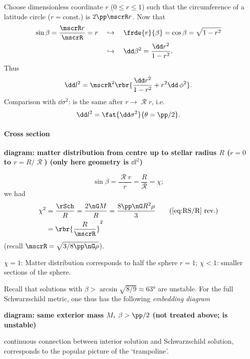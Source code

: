 
Choose dimensionless coordinate $r$ ($0 \le r \le 1$) such that the
circumference of a latitude circle ($r = \text{const.}$) is $2\pp \mscrR r$.
Now that
\begin{align}
\sin\beta = \frac{\mscrR r}{\mscrR} = r
\quad &\hookrightarrow \quad
\frde{r}{\beta} = \cos\beta = \sqrt{1-r^2} \nonumber \\
&\hookrightarrow \quad \dd \beta^2 = \frac{\dd r^2}{1-r^2}.
\end{align}
Thus
\begin{equation}
\dd l^2 = \mscrR^2\rbr{\frac{\dd r^2}{1-r^2}+r^2\dd\,\phi^2}.
\end{equation}
Comparison with $\dd \sigma^2$: is the same after $r\to \mscrR r$, i.e.\
\begin{equation}
\dd l^2 = \fat{\dd \sigma^2}{\theta = \pp/2}.
\end{equation}

\paragraph{Cross section}

\textbf{diagram: matter distribution from centre up to stellar radius $R$
($r = 0$ to $r = R/\mscrR$) (only here geometry is $\dd l^2$)}

\begin{equation}
\sin\beta = \frac{\mscrR r}{r} = \frac{R}{\mscrR} = \chi;
\end{equation}
we had
\begin{align}
\chi^2 &= \frac{\rSch}{R} = \frac{2\nG M}{R} = \frac{8\pp\nG R^2 \rho}{3}
\tag{\ref{eq:RS/R} rev.} \\
&= \rbr{\frac{R}{\mscrR}}^2
\end{align}
(recall $\mscrR = \sqrt{3/8\pp\nG\rho}$).

$\chi = 1$: Matter distribution corresponds to half the sphere $r = 1$;
$\chi < 1$: smaller sections of the sphere.

Recall that solutions with $\beta > \arcsin\sqrt{8/9}\approx\ang{63}$ are
unstable. For the full Schwarzschild metric, one thus has the following
\emph{embedding diagram}

\textbf{diagram: same exterior mass $M$.
$\beta > \pp/2$ (not treated above; is unstable)}

continuous connection between interior solution and Schwarzschild solution,
corresponds to the popular picture of the `trampoline'.

